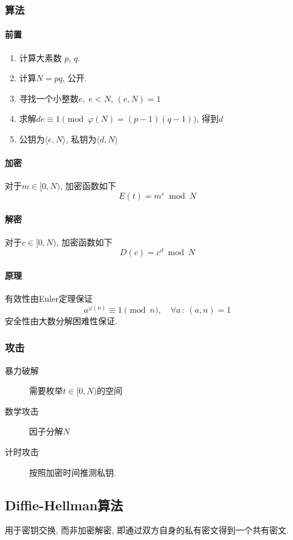 \documentclass{ctexart}
\begin{document}
\subsubsection{算法}
\paragraph{前置}
    \begin{enumerate}
        \item 计算大素数 $p$, $q$.
        \item 计算$N = pq$, 公开.
        \item 寻找一个小整数$e,\;e < N,\,(e, N) = 1$
        \item 求解$d e \equiv 1 \pmod{\varphi(N) = (p-1)(q-1)}$, 得到$d$
        \item 公钥为$\langle e, N \rangle$, 私钥为$\langle d, N \rangle$
    \end{enumerate}
\paragraph{加密}
    对于$m \in [0, N)$, 加密函数如下
    \[ E(t) = m^e \bmod N \]
\paragraph{解密}
    对于$c \in [0, N)$, 加密函数如下
    \[ D(c) = c^d \bmod N \]
\paragraph{原理}
    有效性由Euler定理保证 \[ a^{\varphi(n)} \equiv 1 \pmod{n},\quad \forall a\,:\,(a, n) = 1 \]
    安全性由大数分解困难性保证.

\subsubsection{攻击}
    \begin{description}
        \item[暴力破解] 需要枚举$t \in [0, N)$的空间
        \item[数学攻击] 因子分解$N$
        \item[计时攻击] 按照加密时间推测私钥.
    \end{description}

\subsection{Diffie-Hellman算法}
    用于密钥交换, 而非加密解密, 即通过双方自身的私有密文得到一个共有密文.
\end{document}
